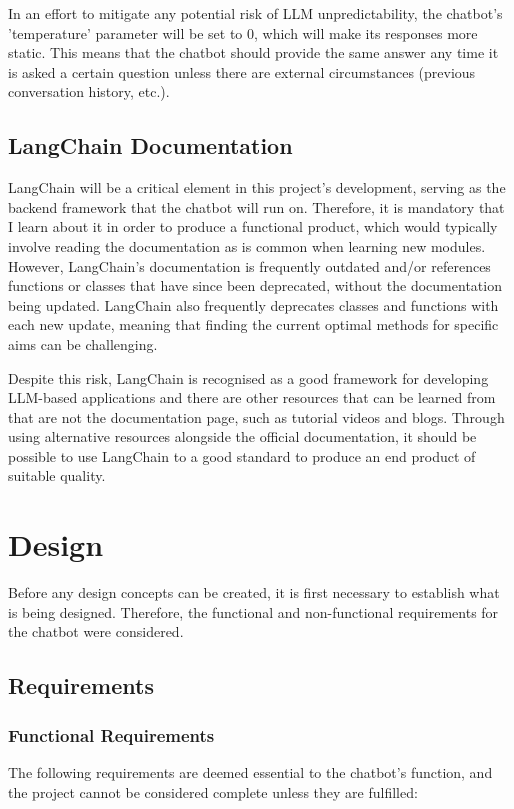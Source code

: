 \para In an effort to mitigate any potential risk of LLM unpredictability, the chatbot's 'temperature' parameter will be set to 0, 
which will make its responses more static. This means that the chatbot should provide the same answer any time it is asked a certain 
question unless there are external circumstances (previous conversation history, etc.). 

\subsection{LangChain Documentation}
LangChain will be a critical element in this project's development, serving as the backend framework that the chatbot will run on.
Therefore, it is mandatory that I learn about it in order to produce a functional product, which would typically involve reading the 
documentation as is common when learning new modules. However, LangChain's documentation is frequently outdated and/or references 
functions or classes that have since been deprecated, without the documentation being updated. LangChain also frequently deprecates classes 
and functions with each new update, meaning that finding the current optimal methods for specific aims can be challenging.

\para Despite this risk, LangChain is recognised as a good framework for developing LLM-based applications and there are other 
resources that can be learned from that are not the documentation page, such as tutorial videos and blogs. Through using alternative 
resources alongside the official documentation, it should be possible to use LangChain to a good standard to produce an end product 
of suitable quality.

\section{Design}
Before any design concepts can be created, it is first necessary to establish what is being designed. Therefore, the functional and 
non-functional requirements for the chatbot were considered.

\subsection{Requirements}\label{sec:Requirements}
\subsubsection{Functional Requirements}
The following requirements are deemed essential to the chatbot's function, and the project cannot be considered complete unless they 
are fulfilled:

